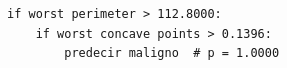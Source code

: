 \begin{verbatim}
if worst perimeter > 112.8000:
    if worst concave points > 0.1396:
        predecir maligno  # p = 1.0000
\end{verbatim}
